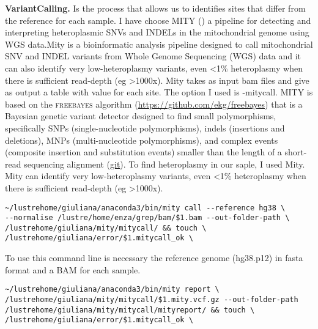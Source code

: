 

\textbf{VariantCalling.} Is the process that allows us to identifies sites that differ from the reference for each sample. I have choose \textsc{MITY} (\cite{puttick2019mity}) a pipeline for detecting and interpreting heteroplasmic SNVs and INDELs in the mitochondrial genome using WGS data.Mity is a bioinformatic analysis pipeline designed to call mitochondrial SNV and INDEL variants from Whole Genome Sequencing (WGS) data and it can also identify very low-heteroplasmy variants, even <1\% heteroplasmy when there is sufficient read-depth (eg >1000x). Mity  takes as input bam files and give as output a table with value for each site. The option I used is -mitycall. \textsc{MITY} is based on the \textsc{freebayes} algorithm (\url{https://github.com/ekg/freebayes}) that is a Bayesian genetic variant detector designed to find small polymorphisms, specifically SNPs (single-nucleotide polymorphisms), indels (insertions and deletions), MNPs (multi-nucleotide polymorphisms), and complex events (composite insertion and substitution events) smaller than the length of a short-read sequencing alignment (\href{https://github.com/ekg/freebayes}{git}).
To find heteroplasmy in our saple, I used Mity.
Mity can identify very low-heteroplasmy variants, even <1\% heteroplasmy when there is sufficient read-depth (eg >1000x). \newline

\begin{verbatim}
~/lustrehome/giuliana/anaconda3/bin/mity call --reference hg38 \
--normalise /lustre/home/enza/grep/bam/$1.bam --out-folder-path \
/lustrehome/giuliana/mity/mitycall/ && touch \
/lustrehome/giuliana/error/$1.mitycall_ok \
\end{verbatim}

To use this command line is necessary the reference genome (hg38.p12) in fasta format and a BAM for each sample. 

\begin{verbatim}
~/lustrehome/giuliana/anaconda3/bin/mity report \
/lustrehome/giuliana/mity/mitycall/$1.mity.vcf.gz --out-folder-path
/lustrehome/giuliana/mity/mitycall/mityreport/ && touch \
/lustrehome/giuliana/error/$1.mitycall_ok \
\end{verbatim}

